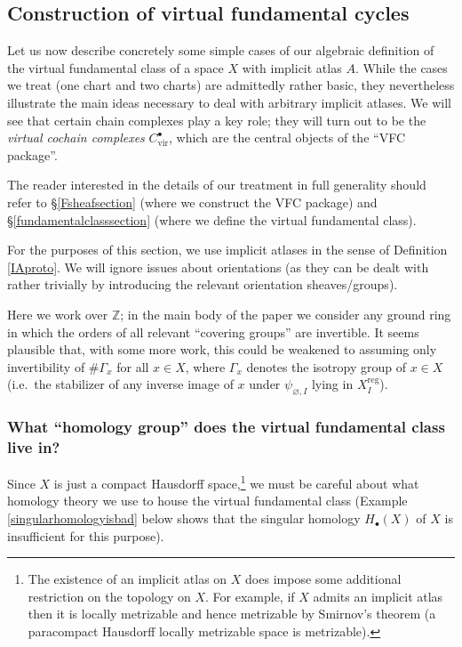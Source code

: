 \documentclass[12pt]{article}
\theoremstyle{definition}
\theoremstyle{remark}
\numberwithin{equation}{subsection}
\newcommand{\ZZ}{\mathbb Z}
\newcommand{\vir}{\mathrm{vir}}
\newcommand{\reg}{\mathrm{reg}}
\begin{document}
\subsection{Construction of virtual fundamental cycles}\label{vfcintrosec}

Let us now describe concretely some simple cases of our algebraic definition of the virtual fundamental class of a space $X$ with implicit atlas $A$.  While the cases we treat (one chart and two charts) are admittedly rather basic, they nevertheless illustrate the main ideas necessary to deal with arbitrary implicit atlases.  We will see that certain chain complexes play a key role; they will turn out to be the \emph{virtual cochain complexes} $C_\vir^\bullet$, which are the central objects of the ``VFC package''.

The reader interested in the details of our treatment in full generality should refer to \S\ref{Fsheafsection} (where we construct the VFC package) and \S\ref{fundamentalclasssection} (where we define the virtual fundamental class).

For the purposes of this section, we use implicit atlases in the sense of Definition \ref{IAproto}.  We will ignore issues about orientations (as they can be dealt with rather trivially by introducing the relevant orientation sheaves/groups).

Here we work over $\ZZ$; in the main body of the paper we consider any ground ring in which the orders of all relevant ``covering groups'' are invertible.  It seems plausible that, with some more work, this could be weakened to assuming only invertibility of $\#\Gamma_x$ for all $x\in X$, where $\Gamma_x$ denotes the isotropy group of $x\in X$ (i.e.\ the stabilizer of any inverse image of $x$ under $\psi_{\varnothing,I}$ lying in $X_I^\reg$).

\subsubsection{What ``homology group'' does the virtual fundamental class live in?}

Since $X$ is just a compact Hausdorff space,\footnote{The existence of an implicit atlas on $X$ does impose some additional restriction on the topology on $X$.  For example, if $X$ admits an implicit atlas then it is locally metrizable and hence metrizable by Smirnov's theorem (a paracompact Hausdorff locally metrizable space is metrizable).} we must be careful about what homology theory we use to house the virtual fundamental class (Example \ref{singularhomologyisbad} below shows that the singular homology $H_\bullet(X)$ of $X$ is insufficient for this purpose).
\end{document}
